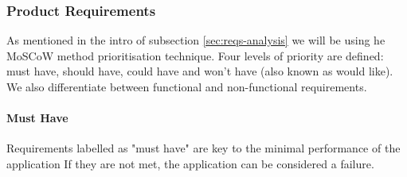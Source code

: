 \subsubsection{Product Requirements}\label{sec:reqs}
As mentioned in the intro of subsection \ref{sec:reqs-analysis} we will be using he MoSCoW method prioritisation technique. Four levels of priority are defined: must have, should have, could have and won't have (also known as would like). We also differentiate between functional and non-functional requirements. 

\paragraph{Must Have}
Requirements labelled as "must have" are key to the minimal performance of the application If they are not met, the application can be considered a failure.

